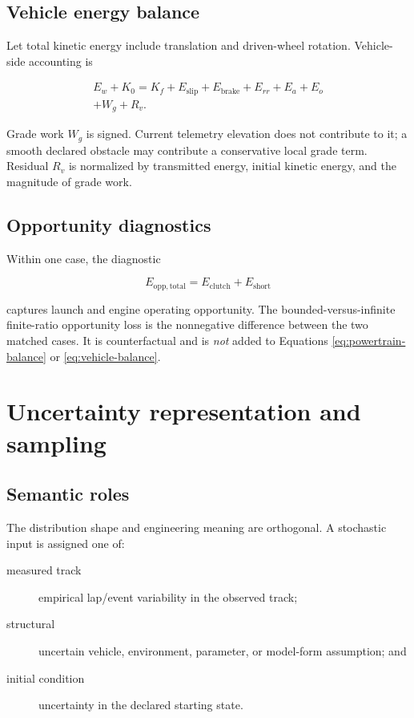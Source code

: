 \documentclass[11pt,oneside]{report}
\begin{document}
\section{Vehicle energy balance}

Let total kinetic energy include translation and driven-wheel rotation.  Vehicle-side
accounting is

\begin{multline}
E_w+K_0=K_f+E_{\mathrm{slip}}+E_{\mathrm{brake}}+E_{rr}+E_a+E_o\\
+W_g+R_v.
\label{eq:vehicle-balance}
\end{multline}

Grade work $W_g$ is signed. Current telemetry elevation does not contribute to it; a smooth
declared obstacle may contribute a conservative local grade term.  Residual $R_v$ is
normalized by transmitted energy, initial kinetic energy, and the magnitude of grade
work.

\section{Opportunity diagnostics}

Within one case, the diagnostic

\begin{equation}
E_{\mathrm{opp,total}}=E_{\mathrm{clutch}}+E_{\mathrm{short}}
\end{equation}

captures launch and engine operating opportunity.  The bounded-versus-infinite
finite-ratio opportunity loss is the nonnegative difference between the two matched
cases.  It is counterfactual and is \emph{not} added to Equations
\eqref{eq:powertrain-balance} or \eqref{eq:vehicle-balance}.

\chapter{Uncertainty representation and sampling}\label{ch:uncertainty}

\section{Semantic roles}

The distribution shape and engineering meaning are orthogonal.  A stochastic input is
assigned one of:

\begin{description}
  \item[measured track] empirical lap/event variability in the observed track;
  \item[structural] uncertain vehicle, environment, parameter, or model-form
        assumption; and
  \item[initial condition] uncertainty in the declared starting state.
\end{description}
\end{document}

